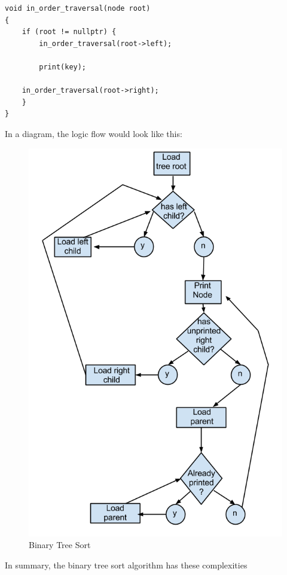 \documentclass{article}
\begin{document}
\begin{lstlisting}
void in_order_traversal(node root)
{
    if (root != nullptr) {
        in_order_traversal(root->left);

        print(key);

	in_order_traversal(root->right);
    }
}
\end{lstlisting}

In a diagram, the logic flow would look like this:

\begin{figure}[H]
  \centering
  \includegraphics[scale=0.4]{./binary_tree.png}
  \caption{Binary Tree Sort}
  \label{fig:Binary Tree Sort}
\end{figure}

In summary, the binary tree sort algorithm has these complexities
\end{document}
